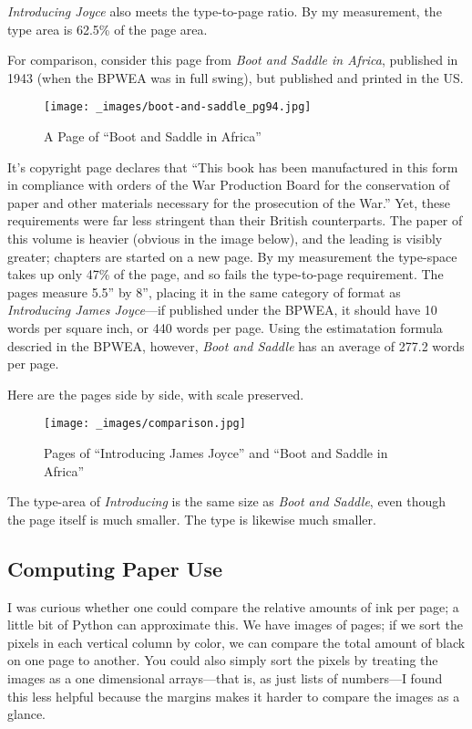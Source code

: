 \documentclass[
  12pt,
]{article}
\begin{document}
\emph{Introducing Joyce} also meets the type-to-page ratio. By my
measurement, the type area is 62.5\% of the page area.

For comparison, consider this page from \emph{Boot and Saddle in
Africa}, published in 1943 (when the BPWEA was in full swing), but
published and printed in the US.

\par\begin{figure}\centering\texttt{[image: \_images/boot-and-saddle\_pg94.jpg]}\caption{A Page of “Boot and Saddle in Africa”}\end{figure}

It's copyright page declares that ``This book has been manufactured in
this form in compliance with orders of the War Production Board for the
conservation of paper and other materials necessary for the prosecution
of the War.'' Yet, these requirements were far less stringent than their
British counterparts. The paper of this volume is heavier (obvious in
the image below), and the leading is visibly greater; chapters are
started on a new page. By my measurement the type-space takes up only
47\% of the page, and so fails the type-to-page requirement. The pages
measure 5.5'' by 8'', placing it in the same category of format as
\emph{Introducing James Joyce}---if published under the BPWEA, it should
have 10 words per square inch, or 440 words per page. Using the
estimatation formula descried in the BPWEA, however, \emph{Boot and
Saddle} has an average of 277.2 words per page.

Here are the pages side by side, with scale preserved.

\par\begin{figure}\centering\texttt{[image: \_images/comparison.jpg]}\caption{Pages of “Introducing James Joyce” and “Boot and Saddle in Africa”}\end{figure}

The type-area of \emph{Introducing} is the same size as \emph{Boot and
Saddle}, even though the page itself is much smaller. The type is
likewise much smaller.

\hypertarget{computing-paper-use}{%
\subsection{Computing Paper Use}\label{computing-paper-use}}

I was curious whether one could compare the relative amounts of ink per
page; a little bit of Python can approximate this. We have images of
pages; if we sort the pixels in each vertical column by color, we can
compare the total amount of black on one page to another. {You could
also simply sort the pixels by treating the images as a one dimensional
arrays---that is, as just lists of numbers---I found this less helpful
because the margins makes it harder to compare the images as a glance.}
\end{document}
